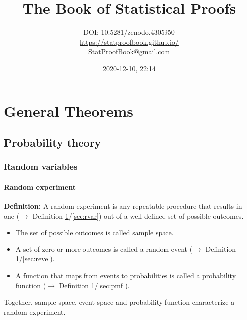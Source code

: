 \documentclass[a4paper,12pt,twoside]{book}
\title{\Huge{The Book of Statistical Proofs}}
\author{DOI: 10.5281/zenodo.4305950 \\ \url{https://statproofbook.github.io/} \\ StatProofBook@gmail.com}
\date{2020-12-10, 22:14}
\begin{document}
\maketitle

\pagebreak
{}
\tableofcontents

\newpage
{}


\chapter{General Theorems} \label{sec:General Theorems} \newpage

\pagebreak
\section{Probability theory}

\subsection{Random variables}

\subsubsection[\textit{Random experiment}]{Random experiment} \label{sec:rexp}
\setcounter{equation}{0}

\textbf{Definition:} A random experiment is any repeatable procedure that results in one ($\rightarrow$ Definition \ref{sec:General Theorems}/\ref{sec:rvar}) out of a well-defined set of possible outcomes.

\begin{itemize}

\item The set of possible outcomes is called sample space.

\item A set of zero or more outcomes is called a random event ($\rightarrow$ Definition \ref{sec:General Theorems}/\ref{sec:reve}).

\item A function that maps from events to probabilities is called a probability function ($\rightarrow$ Definition \ref{sec:General Theorems}/\ref{sec:pmf}).

\end{itemize}

Together, sample space, event space and probability function characterize a random experiment.
\end{document}

